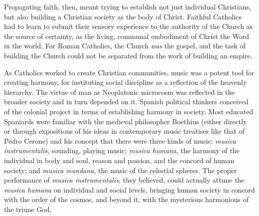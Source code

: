 Propagating faith, then, meant trying to establish not just individual
Christians, but also building a Christian society as the body of Christ.
Faithful Catholics had to learn to submit their sensory experience to the
authority of the Church as the source of certainty, as the living, communal
embodiment of Christ the Word in the world.
For Roman Catholics, the Church \emph{was} the gospel, and the task of building
the Church could not be separated from the work of building an empire.

As Catholics worked to create Christian communities, music was a potent tool for
creating harmony, for instituting social discipline as a reflection of the
heavenly hierarchy.%
    \Autocites{Baker:Harmony}{Irving:Colonial}{Illari:Polychoral}
The virtue of man as Neoplatonic microcosm was reflected in the broader society
and in turn depended on it.
Spanish political thinkers conceived of the colonial project in terms of
establishing harmony in society.%
    \Autocite[22--31]{Baker:Harmony}
Most educated Spaniards were familiar with the medieval philosopher Boethius
(either directly or through expositions of his ideas in contemporary music
treatises like that of Pedro Cerone) and his concept that there were three kinds
of music: \emph{musica instrumentalis}, sounding, playing music; \emph{musica
humana}, the harmony of the individual in body and soul, reason and passion, and
the concord of human society; and \emph{musica mundana}, the music of the
celestial spheres.%
    \Autocites
    [, ]{Cerone:Melopeo}
    [203--208]{Boethius:Musica}
The proper performance of \emph{musica instrumentalis}, they believed, could
actually attune the \emph{musica humana} on individual and social levels,
bringing human society in concord with the order of the cosmos, and beyond it,
with the mysterious harmonious of the triune God.

